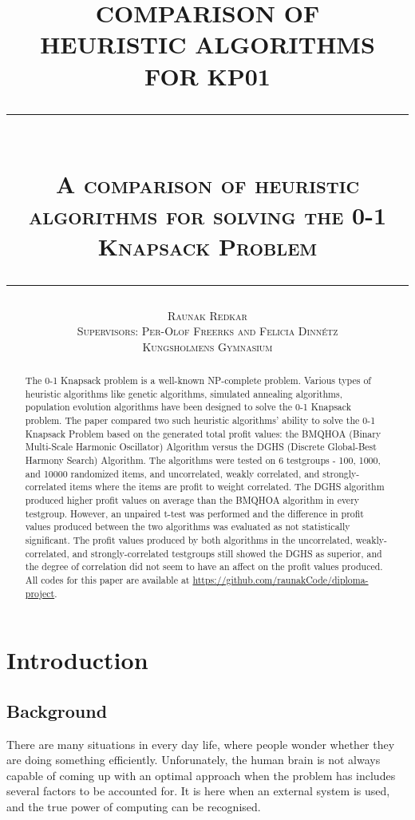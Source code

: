 \documentclass[titlepage]{article}
\title{
    \textbf{COMPARISON OF \\
    HEURISTIC ALGORITHMS \\
    FOR KP01} \\[0.5cm]
    \rule{12cm}{0.3mm} \\[0.5cm] 
    \small \scshape{A comparison of heuristic algorithms for solving the 0-1 Knapsack Problem} \\[0.4cm]
    \rule{12cm}{0.3mm}
    \vskip -0.3cm
}
\author{
    \small \scshape{Raunak Redkar} \\ 
    \small \scshape{Supervisors: Per-Olof Freerks and Felicia Dinnétz} \\
    \scriptsize \scshape{Kungsholmens Gymnasium}
}
\begin{document}
\renewcommand{\arraystretch}{1.5}

\onehalfspacing

\maketitle

\newpage

\begin{abstract}
    The 0-1 Knapsack problem is a well-known NP-complete problem. Various types of heuristic algorithms like genetic algorithms, simulated annealing algorithms, population evolution algorithms have been designed to solve the 0-1 Knapsack problem. The paper compared two such heuristic algorithms' ability to solve the 0-1 Knapsack Problem based on the generated total profit values: the BMQHOA (Binary Multi-Scale Harmonic Oscillator) Algorithm versus the DGHS (Discrete Global-Best Harmony Search) Algorithm. The algorithms were tested on 6 testgroups - 100, 1000, and 10000 randomized items, and uncorrelated, weakly correlated, and strongly-correlated items where the items are profit to weight correlated. The DGHS algorithm produced higher profit values on average than the BMQHOA algorithm in every testgroup. However, an unpaired t-test was performed and the difference in profit values produced between the two algorithms was evaluated as not statistically significant. The profit values produced by both algorithms in the uncorrelated, weakly-correlated, and strongly-correlated testgroups still showed the DGHS as superior, and the degree of correlation did not seem to have an affect on the profit values produced.  All codes for this paper are available at \href{github.com/raunakCode}{https://github.com/raunakCode/diploma-project}.
\end{abstract}

\newpage


\tableofcontents
\listofalgorithms
\newpage

\section{Introduction}

\subsection{Background}

\renewcommand{\familydefault}{Computer Modern}
There are many situations in every day life, where people wonder whether they are doing something efficiently. Unforunately, the human brain is not always capable of coming up with an optimal approach when the problem has includes several factors to be accounted for. It is here when an external system is used, and the true power of computing can be recognised. 
\end{document}
